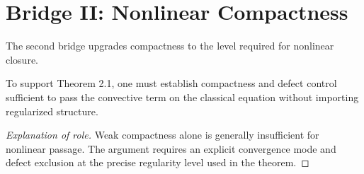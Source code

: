 \section{Bridge II: Nonlinear Compactness}

The second bridge upgrades compactness to the level required for nonlinear closure.

\begin{proposition}
To support Theorem 2.1, one must establish compactness and defect control sufficient to pass the convective term on the classical equation without importing regularized structure.
\end{proposition}

\begin{proof}[Explanation of role]
Weak compactness alone is generally insufficient for nonlinear passage. The argument requires an explicit convergence mode and defect exclusion at the precise regularity level used in the theorem.
\end{proof}
